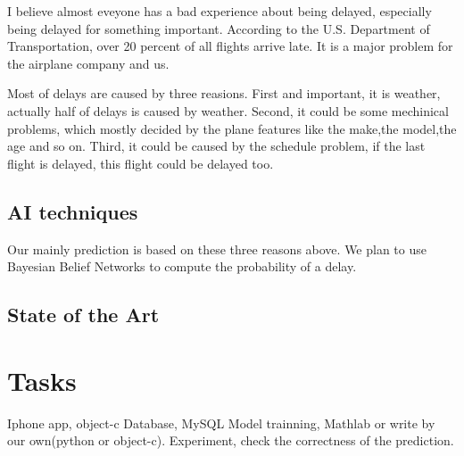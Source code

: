 \documentclass[12pt]{article}
\begin{document}
I believe almost eveyone has a bad experience about being delayed,
especially being delayed for something important. According to the
U.S. Department of Transportation, over 20 percent of all flights
arrive late. It is a major problem for the airplane company and us. 

Most of delays are caused by three reasions. First and important, it
is weather, actually half of delays is caused by weather. Second,
it could be some mechinical problems, which mostly decided by the plane
features like the make,the model,the age and so on. Third, it could be
caused by the schedule problem, if the last flight is delayed, this flight could
be delayed too. 





\subsection{AI techniques}


Our mainly prediction is based on these three reasons above. 
We plan to use Bayesian Belief Networks to compute the probability of a delay.


\subsection{State of the Art}





\section{Tasks}

Iphone app, object-c
Database, MySQL
Model trainning, Mathlab or write by our own(python or object-c).
Experiment, check the correctness of the prediction.
\end{document}
